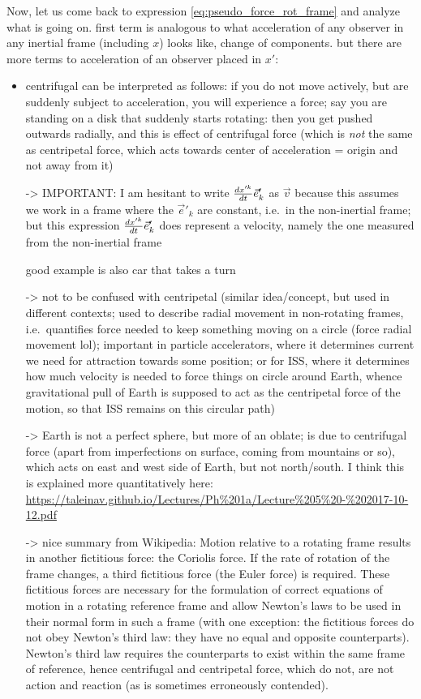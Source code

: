 \documentclass[../class_mech_main.tex]{subfiles}
\begin{document}
Now, let us come back to expression \eqref{eq:pseudo_force_rot_frame} and analyze what is going on. first term is analogous to what acceleration of any observer in any inertial frame (including $x$) looks like, change of components. but there are more terms to acceleration of an observer placed in $x'$:
\begin{itemize}
    \item centrifugal can be interpreted as follows: if you do not move actively, but are suddenly subject to acceleration, you will experience a force; say you are standing on a disk that suddenly starts rotating: then you get pushed outwards radially, and this is effect of centrifugal force (which is \emph{not} the same as centripetal force, which acts towards center of acceleration = origin and not away from it)
    
	-> IMPORTANT: I am hesitant to write $\dv{x'^k}{t} \vec{e}'_k$ as $\vec{v}$ because this assumes we work in a frame where the $\vec{e}'_k$ are constant, i.e.~in the non-inertial frame; but this expression $\dv{x'^k}{t} \vec{e}'_k$ does represent a velocity, namely the one measured from the non-inertial frame
    
    good example is also car that takes a turn
    
    -> not to be confused with centripetal (similar idea/concept, but used in different contexts; used to describe radial movement in non-rotating frames, i.e.~quantifies force needed to keep something moving on a circle (force radial movement lol); important in particle accelerators, where it determines current we need for attraction towards some position; or for ISS, where it determines how much velocity is needed to force things on circle around Earth, whence gravitational pull of Earth is supposed to act as the centripetal force of the motion, so that ISS remains on this circular path)

    -> Earth is not a perfect sphere, but more of an oblate; is due to centrifugal force (apart from imperfections on surface, coming from mountains or so), which acts on east and west side of Earth, but not north/south. I think this is explained more quantitatively here: \url{https://taleinav.github.io/Lectures/Ph%201a/Lecture%205%20-%202017-10-12.pdf}


    -> nice summary from Wikipedia: Motion relative to a rotating frame results in another fictitious force: the Coriolis force. If the rate of rotation of the frame changes, a third fictitious force (the Euler force) is required. These fictitious forces are necessary for the formulation of correct equations of motion in a rotating reference frame and allow Newton's laws to be used in their normal form in such a frame (with one exception: the fictitious forces do not obey Newton's third law: they have no equal and opposite counterparts). Newton's third law requires the counterparts to exist within the same frame of reference, hence centrifugal and centripetal force, which do not, are not action and reaction (as is sometimes erroneously contended).



\end{itemize}
\end{document}
